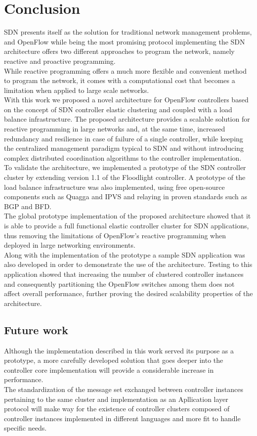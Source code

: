 
\chapter{Conclusion}
\label{chapter:conclusion}
\gls{SDN} presents itself as the solution for traditional network management problems, and OpenFlow while being the most promising protocol implementing the \gls{SDN} architecture offers two different approaches to program the network, namely reactive and proactive programming.\\
While reactive programming offers a much more flexible and convenient method to program the network, it comes with a computational cost that becomes a limitation when applied to large scale networks.\\
With this work we proposed a novel architecture for OpenFlow controllers based on the concept of SDN controller elastic clustering and coupled with a load balance infrastructure.
The proposed architecture provides a scalable solution for reactive programming in large networks and, at the same time, increased redundancy and resilience in case of failure of a single controller, while keeping the centralized management paradigm typical to \gls{SDN} and without introducing complex distributed coordination algorithms to the controller implementation.\\
To validate the architecture, we implemented a prototype of the \gls{SDN} controller cluster by extending version 1.1 of the Floodlight controller.
A prototype of the load balance infrastructure was also implemented, using free open-source components such as Quagga and \gls{IPVS} and relaying in proven standards such as \gls{BGP} and \gls{BFD}.\\
%
The global prototype implementation of the proposed architecture showed that it is able to provide a full functional elastic controller cluster for \gls{SDN} applications, thus removing the limitations of OpenFlow's reactive programming when deployed in large networking environments.\\
%
Along with the implementation of the prototype a sample \gls{SDN} application was also developed in order to demonstrate the use of the architecture.
Testing to this application showed that increasing the number of clustered controller instances and consequently partitioning the OpenFlow switches among them does not affect overall performance, further proving the desired scalability properties of the architecture.
%
\section{Future work}
\label{section:future-work}
Although the implementation described in this work served its purpose as a prototype, a more carefully developed solution that goes deeper into the controller core implementation will provide a considerable increase in performance.\\
The standardization of the message set exchanged between controller instances pertaining to the same cluster and implementation as an Apllication layer protocol will make way for the existence of controller clusters composed of controller instances implemented in different languages and more fit to handle specific needs. 
